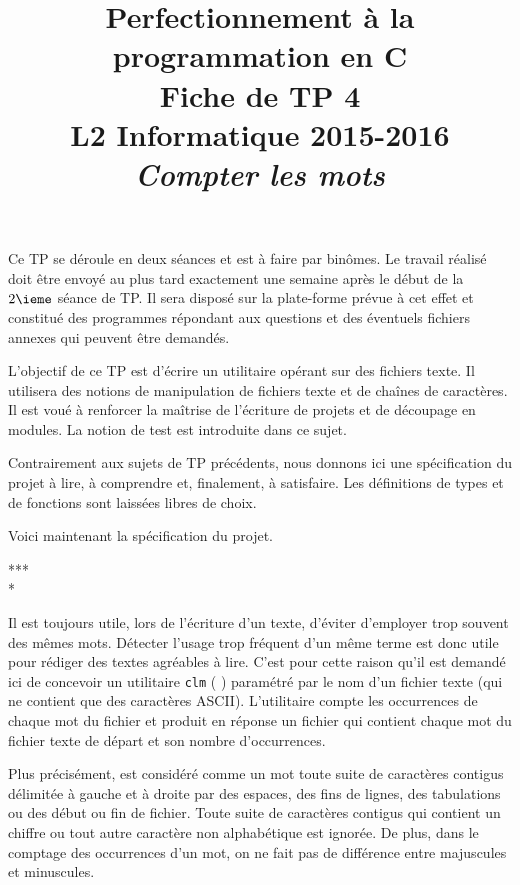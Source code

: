 \documentclass[11pt]{article}
\date{}
\title{{\bf Perfectionnement à la programmation en {\sf C}} \\
    Fiche de TP 4 \\
    {\small L2 Informatique 2015-2016} \\
    {\it \small Compter les mots}}
\theoremstyle{definition}
\begin{document}
\maketitle

Ce TP se déroule en deux séances et est à faire par binômes. Le travail
réalisé doit être envoyé au plus tard exactement une semaine après le
début de la $2\ieme$ séance de TP. Il sera disposé sur la plate-forme
prévue à cet effet et constitué des programmes répondant aux questions
et des éventuels fichiers annexes qui peuvent être demandés.
\bigskip
\bigskip

L'objectif de ce TP est d'écrire un utilitaire opérant sur des fichiers
texte. Il utilisera des notions de manipulation de fichiers texte et de
chaînes de caractères. Il est voué à renforcer la maîtrise de
l'écriture de projets et de découpage en modules. La notion de test est
introduite dans ce sujet.
\bigskip

Contrairement aux sujets de TP précédents, nous donnons ici une
spécification du projet à lire, à comprendre et, finalement, à satisfaire.
Les définitions de types et de fonctions sont laissées libres de choix.
\bigskip

Voici maintenant la spécification du projet.
\bigskip

\begin{center} *** \\ * \end{center}
\medskip

Il est toujours utile, lors de l'écriture d'un texte, d'éviter d'employer
trop souvent des mêmes mots. Détecter l'usage trop fréquent d'un même
terme est donc utile pour rédiger des textes agréables à lire. C'est pour
cette raison qu'il est demandé ici de concevoir un utilitaire {\tt clm}
( \fg) paramétré par le nom d'un fichier texte
(qui ne contient que des caractères ASCII). L'utilitaire compte les
occurrences de chaque mot du fichier et produit en réponse un fichier
qui contient chaque mot du fichier texte de départ et son nombre
d'occurrences.
\medskip

Plus précisément, est considéré comme un mot toute suite de caractères
contigus délimitée à gauche et à droite par des espaces, des fins de
lignes, des tabulations ou des début ou fin de fichier. Toute suite de
caractères contigus qui contient un chiffre ou tout autre caractère non
alphabétique est ignorée. De plus, dans le comptage des occurrences d'un
mot, on ne fait pas de différence entre majuscules et minuscules.
\medskip
\end{document}
